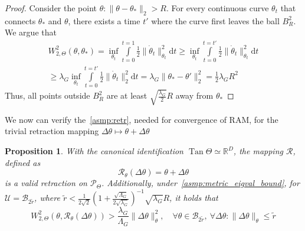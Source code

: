 \documentclass{article} %
\newtheorem{proposition}{Proposition}[section]
\numberwithin{equation}{subsection}
\numberwithin{theorem}{section}
\newcommand{\dd}{\mathrm{d}}
\newcommand{\cR}{\mathcal{R}}
\newcommand{\cU}{\mathcal{U}}
\newcommand{\cB}{\mathcal{B}}
\newcommand{\PWspace}{\mathcal{P}_\Theta}
\begin{document}
    \begin{proof}
        Consider the point $\theta : \|\theta - \theta_*\|_2 > R$.
        For every continuous curve $\theta_t$ that connects $\theta_*$ and $\theta$, there exists a time $t'$ where the curve first leaves the ball $B^2_R$.
        We argue that
        \begin{multline*}
            W^2_{2,\Theta}(\theta, \theta_*) 
                = \inf_{\theta_t} \int\limits_{t=0}^{t=1} \frac{1}{2}\| \dot\theta_t\|^2_{\theta_t}\dd t 
                \geq \inf_{\theta_t} \int\limits_{t=0}^{t=t'} \frac{1}{2}\|\dot\theta_t\|^2_{\theta_t}\dd t \\
                \geq \lambda_{G} \inf_{\theta_t} \int\limits_{t=0}^{t=t'}\frac{1}{2} \| \dot\theta_t\|^2_{2}\dd t 
                = \lambda_{G} \|\theta_* -\theta'\|_2^2 = \frac{1}{2}\lambda_{G} R^2
        \end{multline*}
        Thus, all points outside $B^2_R$ are at least $\sqrt{\frac{\lambda_{G}}{2}}R$ away from $\theta_*$ 
    \end{proof}
    We now can verify the~\autoref{asmp:retr}, needed for convergence of RAM, for the trivial retraction mapping $\Delta\theta \mapsto \theta + \Delta\theta$
    \begin{proposition}
        With the canonical identification $\operatorname{Tan}\Theta \simeq \mathbb{R}^D$, the mapping $\cR$, defined as
        \begin{equation}
            \cR_{\theta}(\Delta\theta) = \theta + \Delta\theta
        \end{equation}
        is a valid retraction on $\PWspace$.
        Additionally, under~\autoref{asmp:metric_eigval_bound}, for $\cU = \cB_{2\tilde{r}}$, where 
            $\tilde{r} < \frac{1}{2\sqrt{2}}\left(1 + \frac{\sqrt{\Lambda_{G}}}{2\sqrt{\lambda_{G}}}\right)^{-1}\sqrt{\lambda_{G}}R$, 
            it holds that
        \begin{equation}
            W^2_{2,\Theta}(\theta, \cR_\theta(\Delta\theta)) > \frac{\lambda_{G}}{\Lambda_{G}}\|\Delta\theta\|_\theta^2,
            \quad \forall \theta \in \cB_{2\tilde{r}},\ \forall \Delta\theta: \|\Delta\theta\|_\theta \leq \tilde{r}
        \end{equation}
    \end{proposition}
\end{document}
